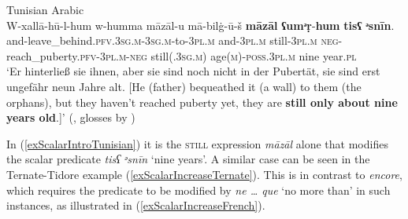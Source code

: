\begin{exe}
	 Tunisian Arabic\\
	\gll W-xallā-hū-l-hum w-humma māzāl-u mā-bilġ-ū-š \textbf{māzāl} \textbf{ʕumᵊṛ}-\textbf{hum} \textbf{tisʕ} \textbf{ᵊsnīn}.\\
	and-leave\_behind.\textsc{pfv}.3\textsc{sg}.\textsc{m}-3\textsc{sg}.\textsc{m}-to-3\textsc{pl}.\textsc{m} and-3\textsc{pl}.\textsc{m} still-3\textsc{pl}.\textsc{m} \textsc{neg}-reach\_puberty.\textsc{pfv}-3\textsc{pl}.\textsc{m}-\textsc{neg} still(.3\textsc{sg}.\textsc{m}) age(\textsc{m})-\textsc{poss}.3\textsc{pl}.\textsc{m} nine year.\textsc{pl}\\
	\glt \lq Er hinterließ sie ihnen, aber sie sind noch nicht in der Pubertät, sie sind erst ungefähr neun Jahre alt. [He (father) bequeathed it (a wall) to them (the orphans), but they haven’t reached puberty yet, they are \textbf{still only about nine years old}.]\rq{ }(\cite[220–221]{RittBenmimoun2011}, glosses by \cite{FischerEtAlTunisian})
\end{exe}

In (\ref{exScalarIntroTunisian}) it is the \textsc{still} expression \textit{māzāl} alone that modifies the scalar predicate \textit{tisʕ} \textit{ᵊsnīn} \lq nine years\rq{}. A similar case can be seen in the Ternate-Tidore example (\ref{exScalarIncreaseTernate}). This is in contrast to  \textit{encore}, which requires the predicate to be modified by \textit{ne … que} \lq no more than\rq{} in such instances, as illustrated in (\ref{exScalarIncreaseFrench}).

